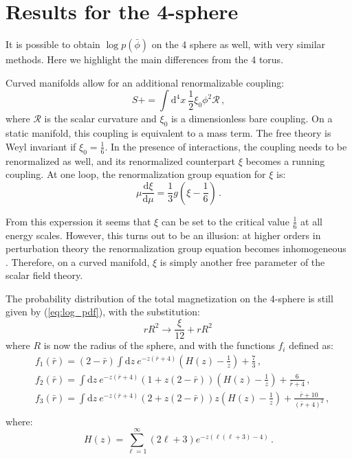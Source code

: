 \documentclass[11pt,a4paper]{article}
\newcommand{\dd}{\mathrm{d}}
\begin{document}
\section{Results for the 4-sphere}
\label{sec:four_sphere}
It is possible to obtain $\log p(\bar{\phi})$ on the 4 sphere as well, with
very similar methods. Here we highlight the main differences from the 4 torus.

Curved manifolds allow for an additional renormalizable coupling: 
\begin{equation}
    S += \int \dd^4 x\ \frac{1}{2}\xi_0 \phi^2 \mathcal{R}\,,
\end{equation}
where $\mathcal{R}$ is the scalar curvature and $\xi_0$ is a dimensionless bare
coupling. On a static manifold, this coupling is equivalent to a mass term.
The free theory is Weyl invariant if $\xi_0 = \frac{1}{6}$. In the
presence of interactions, the coupling needs to be renormalized as well, and
its renormalized counterpart $\xi$ becomes a running coupling. At one loop, the
renormalization group equation for $\xi$ is:
\begin{equation}
    \mu \frac{\dd \xi}{\dd \mu} =  \frac{1}{3} g \left(\xi - \frac{1}{6}\right)\,.
\end{equation}

From this experssion it seems that $\xi$ can be set to the critical value
$\frac{1}{6}$ at all energy scales. However, this turns out to be an illusion:
at higher orders in perturbation theory the renormalization group equation
becomes inhomogeneous \cite{Brown1980}. Therefore, on a curved manifold, $\xi$
is simply another free parameter of the scalar field theory.

The probability distribution of the total magnetization on the 4-sphere is
still given by (\ref{eq:log_pdf}), with the substitution:
\begin{equation}
    rR^2 \to \frac{\xi}{12} + r R^2\,
\end{equation}
where $R$ is now the radius of the sphere, and with the functions $f_i$ defined
as:
\begin{align}
    &f_1(\bar{r}) = (2 - \bar{r})\int \dd z\ e^{-z(\bar{r} + 4)} \left(H(z) - \frac{1}{z}\right) + \frac{7}{3}\,,\\
    &f_2(\bar{r}) = \int \dd z\ e^{-z(\bar{r} + 4)} 
    \left(1 + z (2 - \bar{r})\right) \left(H(z) - \frac{1}{z}\right)+ \frac{6}{\bar{r} + 4}\,,\\
    &f_3(\bar{r}) = \int \dd z\ e^{-z(\bar{r} + 4)} 
    \left(2 + z (2 - \bar{r})\right)z \left(H(z) - \frac{1}{z}\right) + \frac{\bar{r} + 10 }{(\bar{r} + 4)^2}\,,\\
\end{align}
where:
\begin{equation}
    H(z) = \sum_{\ell = 1}^{\infty} (2\ell + 3)e^{-z (\ell(\ell + 3) - 4)}\,.
\end{equation}
\end{document}
